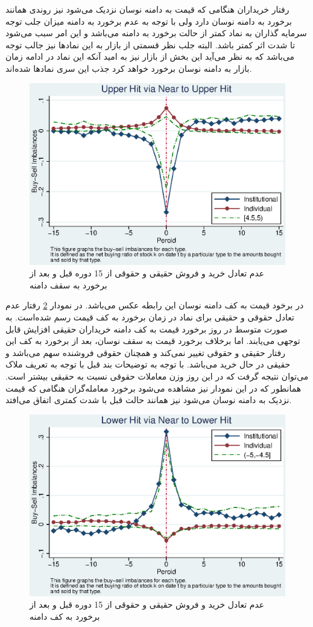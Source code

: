 \documentclass[12pt]{article}
\begin{document}
رفتار خریداران هنگامی که قیمت به دامنه نوسان نزدیک می‌شود نیز روندی همانند برخورد به دامنه نوسان دارد ولی با توجه به عدم برخورد به دامنه میزان جلب توجه سرمایه گذاران به نماد کمتر از حالت برخورد به دامنه می‌باشد و این امر سبب می‌شود تا شدت اثر کمتر باشد. البته جلب نظر قسمتی از بازار به این نماد‌ها نیز جالب توجه می‌باشد که به نظر می‌آید این بخش از بازار نیز به امید آنکه این نماد در ادامه زمان بازار به دامنه نوسان برخورد خواهد کرد جذب این سری نماد‌ها شده‌اند.
 
 \begin{figure}[htbp]
  \centering
  \includegraphics[width=0.8\columnwidth]{TUI.eps}
  \caption{عدم تعادل خرید و فروش حقیقی و حقوقی از 15 دوره قبل  و بعد از برخورد  به سقف دامنه }
  \label{g22}
  \end{figure}
 
 
 در برخود قیمت به کف دامنه نوسان این رابطه عکس می‌باشد. در نمودار
 \ref{g23}
 رفتار عدم تعادل حقوقی و حقیقی برای نماد در زمان برخورد به کف قیمت رسم شده‌است. به صورت متوسط در روز برخورد قیمت به کف دامنه خریداران حقیقی افزایش قابل توجهی می‌یابند. اما برخلاف برخورد قیمت به سقف نوسان، بعد از برخورد به کف این رفتار حقیقی و حقوقی تغییر نمی‌کند و همچنان حقوقی فروشنده سهم می‌باشد و حقیقی در حال خرید می‌باشد. با توجه به توضیحات بند قبل با توجه به تعریف ملاک می‌توان نتیجه گرفت که در این روز وزن معاملات حقوقی نسبت به حقیقی بیشتر است. همانطور که در این نمودار نیز مشاهده می‌شود برخورد معامله‌گران هنگامی که قیمت نزدیک به دامنه نوسان می‌شود نیز همانند حالت قبل با شدت کمتری اتفاق می‌افتد.
 

\begin{figure}[htbp]
\centering
\includegraphics[width=0.8\columnwidth]{CLI.eps}
\caption{عدم تعادل خرید و فروش حقیقی و حقوقی از 15 دوره قبل   و بعد از برخورد به کف دامنه }
\label{g23}
\end{figure}
\end{document}
